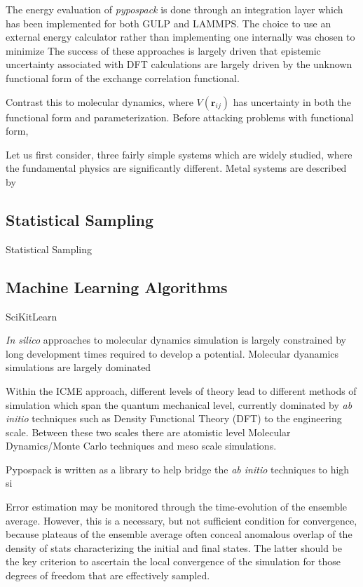 The energy evaluation of \emph{pypospack} is done through an integration layer which has been implemented for both GULP and LAMMPS.  The choice to use an external energy calculator rather than implementing one internally was chosen to minimize
The success of these approaches is largely driven that epistemic uncertainty associated with DFT calculations are largely driven by the unknown functional form of the exchange correlation functional.

Contrast this to molecular dynamics, where $V(\bm{r}_{ij})$ has uncertainty in both the functional form and parameterization.  Before attacking problems with functional form,

Let us first consider, three fairly simple systems which are widely studied, where the fundamental physics are significantly different.  Metal systems are described by

\subsection{Statistical Sampling}

Statistical Sampling

\subsection{Machine Learning Algorithms}

SciKitLearn

\emph{In silico} approaches to molecular dynamics simulation is largely constrained by long development times required to develop a potential.  Molecular dyanamics simulations are largely dominated

Within the ICME approach, different levels of theory lead to different methods of simulation which span the quantum mechanical level, currently dominated by \emph{ab initio} techniques such as Density Functional Theory (DFT) to the engineering scale.  Between these two scales there are atomistic level Molecular Dynamics/Monte Carlo techniques and meso scale simulations.

Pypospack is written as a library to help bridge the \emph{ab initio} techniques to high si



Error estimation may be monitored through the time-evolution of the ensemble average.  However, this is a necessary, but not sufficient condition for convergence, because plateaus of the ensemble average often conceal anomalous overlap of the density of stats characterizing the initial and final states.  The latter should be the key criterion to ascertain the local convergence of the simulation for those degrees of freedom that are effectively sampled.

